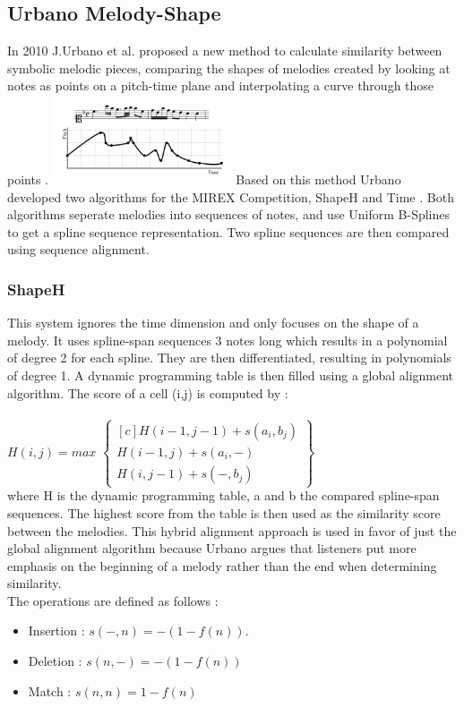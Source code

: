 \documentclass{llncs}
\begin{document}
		\subsection{Urbano Melody-Shape}
        In 2010 J.Urbano et al. proposed a new method to calculate similarity between symbolic melodic pieces, comparing the shapes of melodies created by looking at notes as points on a pitch-time plane and interpolating a curve through those points \cite{five_point_five}.
        \includegraphics[width=200px,height=100px,keepaspectratio]{one_of_five_point_one}
        Based on this method Urbano developed two algorithms for the MIREX Competition, ShapeH and Time \cite{five_point_two}. Both algorithms seperate melodies into sequences of notes, and use Uniform B-Splines to get a spline sequence representation. Two spline sequences are then compared using sequence alignment.
        \subsubsection{ShapeH} 
        This system ignores the time dimension and only focuses on the shape of a melody. It uses spline-span sequences 3 notes long which results in a polynomial of degree 2 for each spline. They are then differentiated, resulting in polynomials of degree 1. 
        A dynamic programming table is then filled using a global alignment algorithm. The score of a cell (i,j) is computed by : \\ \\
        $H(i,j) = max $
       $\begin{Bmatrix*}[c]
        H(i-1, j-1) + s(a_i, b_j) \\
        H(i-1,j) + s(a_i, -) \\
        H(i, j-1) + s(-,b_j)
        \end{Bmatrix*}$
		\\
		where H is the dynamic programming table, a and b the compared spline-span sequences. The highest score from the table is then used as the similarity score between the melodies. This hybrid alignment approach is used in favor of just the global alignment algorithm because Urbano argues that listeners put more emphasis on the beginning of a melody rather than the end when determining similarity. \\
		The operations are defined as follows : 
        \begin{itemize}
         \item Insertion : 
        $ s(-,n) = -(1-f(n)).$
        \item Deletion : 
         $s(n,-) = -(1 - f(n))$
        \item Match : 
        $s(n,n) = 1-f(n)$
        \end{itemize}
        
\end{document}
